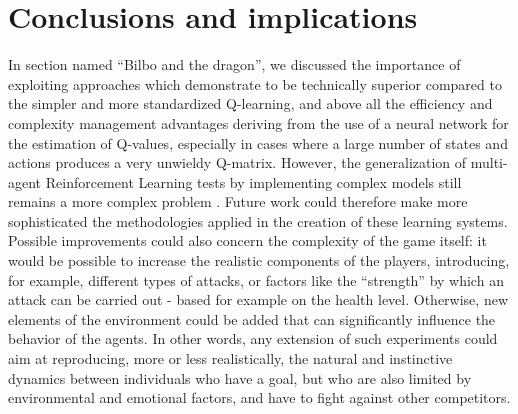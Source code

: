 \section{Conclusions and implications}
In section named ``Bilbo and the dragon'', we discussed the importance of exploiting approaches which demonstrate to be technically superior compared to the simpler and more standardized Q-learning, and above all the efficiency and complexity management advantages deriving from the use of a neural network for the estimation of Q-values, especially in cases where a large number of states and actions produces a very unwieldy Q-matrix. However, the generalization of multi-agent Reinforcement Learning tests by implementing complex models still remains a more complex problem \cite{1}. Future work could therefore make more sophisticated the methodologies applied in the creation of these learning systems.
Possible improvements could also concern the complexity of the game itself: it would be possible to increase the realistic components of the players, introducing, for example, different types of attacks, or factors like the ``strength'' by which an attack can be carried out - based for example on the health level. Otherwise, new elements of the environment could be added that can significantly influence the behavior of the agents.
In other words, any extension of such experiments could aim at reproducing, more or less realistically, the natural and instinctive dynamics between individuals who have a goal, but who are also limited by environmental and emotional factors, and have to fight against other competitors.
\newpage




